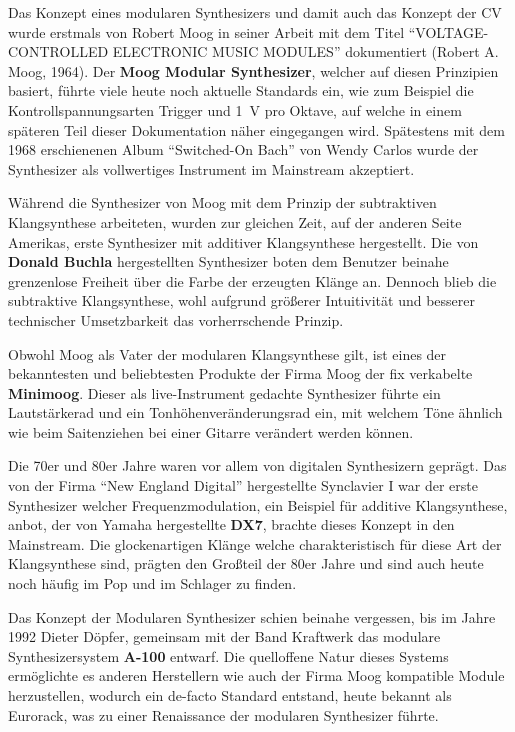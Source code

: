 Das Konzept eines modularen Synthesizers und damit auch das Konzept der \acl{CV} wurde erstmals von Robert Moog in seiner Arbeit mit dem Titel "`VOLTAGE-CONTROLLED ELECTRONIC MUSIC MODULES"' dokumentiert (Robert A. Moog, 1964). Der \textbf{Moog Modular Synthesizer}, welcher auf diesen Prinzipien basiert, führte viele heute noch aktuelle Standards ein, wie zum Beispiel die Kontrollspannungsarten Trigger und \SI{1}{\volt} pro Oktave, auf welche in einem späteren Teil dieser Dokumentation näher eingegangen wird. Spätestens mit dem 1968 erschienenen Album "`Switched-On Bach"' von Wendy Carlos wurde der Synthesizer als vollwertiges Instrument im Mainstream akzeptiert.

Während die Synthesizer von Moog mit dem Prinzip der subtraktiven Klangsynthese arbeiteten, wurden zur gleichen Zeit, auf der anderen Seite Amerikas, erste Synthesizer mit additiver Klangsynthese hergestellt. Die von \textbf{Donald Buchla} hergestellten Synthesizer boten dem Benutzer beinahe grenzenlose Freiheit über die Farbe der erzeugten Klänge an. Dennoch blieb die subtraktive Klangsynthese, wohl aufgrund größerer Intuitivität und besserer technischer Umsetzbarkeit das vorherrschende Prinzip.

Obwohl Moog als Vater der modularen Klangsynthese gilt, ist eines der bekanntesten und beliebtesten Produkte der Firma Moog der fix verkabelte \textbf{Minimoog}. Dieser als live-Instrument gedachte Synthesizer führte ein Lautstärkerad und ein Tonhöhenveränderungsrad ein, mit welchem Töne ähnlich wie beim Saitenziehen bei einer Gitarre verändert werden können.

Die 70er und 80er Jahre waren vor allem von digitalen Synthesizern geprägt. Das von der Firma "`New England Digital"' hergestellte Synclavier I war der erste Synthesizer welcher Frequenzmodulation, ein Beispiel für additive Klangsynthese, anbot, der von Yamaha hergestellte \textbf{DX7}, brachte dieses Konzept in den Mainstream. Die glockenartigen Klänge welche charakteristisch für diese Art der Klangsynthese sind, prägten den Großteil der 80er Jahre und sind auch heute noch häufig im Pop und im Schlager zu finden.

Das Konzept der Modularen Synthesizer schien beinahe vergessen, bis im Jahre 1992 Dieter Döpfer, gemeinsam mit der Band Kraftwerk das modulare Synthesizersystem \textbf{A-100} entwarf. Die quelloffene Natur dieses Systems ermöglichte es anderen Herstellern wie auch der Firma Moog kompatible Module herzustellen, wodurch ein de-facto Standard entstand, heute bekannt als Eurorack, was zu einer Renaissance der modularen Synthesizer führte.

